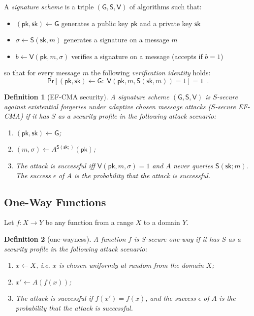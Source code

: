 \documentclass{article}
\newtheorem{definition}{Definition}[section]
\newcommand{\keygen}[0]{\mathsf{G}}
\newcommand{\sig}[0]{\mathsf{S}}
\newcommand{\sigver}[0]{\mathsf{V}}
\newcommand{\pubkey}[0]{\mathsf{pk}}
\newcommand{\prikey}[0]{\mathsf{sk}}
\begin{document}
A \emph{signature scheme} is a triple $(\keygen, \sig, \sigver)$ of algorithms such that:
\begin{itemize}
\item $(\pubkey, \prikey) \gets \keygen$ generates a public key $\pubkey$ and a private key $\prikey$
\item $\sigma \gets \sig(\prikey, m)$ generates a signature on a message $m$
\item $b \gets \sigver (\pubkey, m, \sigma)$ verifies a signature on a message (accepts if $b = 1$)
\end{itemize}
so that for every message $m$ the following \emph{verification identity} holds:
\[
\mathsf{Pr}[(\pubkey, \prikey) \gets \keygen \colon\; \sigver(\pubkey, m, \sig(\prikey, m)) = 1] = 1 \enspace.
\]

\begin{definition}[EF-CMA security]
A signature scheme $(\keygen, \sig, \sigver)$ is $S$-secure against existential forgeries under adaptive chosen message attacks ($S$-secure EF-CMA) if it has $S$ as a security profile in the following attack scenario:
\begin{enumerate}
\item $(\pubkey, \prikey) \gets \keygen$;
\item $(m,\sigma)\gets A^{\mathsf{S}(\prikey;)}(\pubkey)$;
\item The attack is successful iff $\mathsf{V}(\pubkey, m, \sigma)=1$
and $A$ never queries $\mathsf{S}(\prikey;m)$.
The success $\epsilon$ of $A$ is the probability that the attack is successful.
\end{enumerate}
\end{definition}

\subsection{One-Way Functions}

Let $f\colon X \rightarrow Y$ be any function from a range $X$ to a domain $Y$.

\begin{definition}[one-wayness]
A function $f$ is $S$-secure one-way if it has $S$ as a security profile in the following attack scenario:
\begin{enumerate}
\item $x\gets X$, i.e. $x$ is chosen uniformly at random from the domain $X$;
\item $x'\gets A(f(x))$;
\item The attack is successful if $f(x')=f(x)$,
and the success $\epsilon$ of $A$ is the probability that the attack is successful.
\end{enumerate}
\end{definition}
\end{document}
